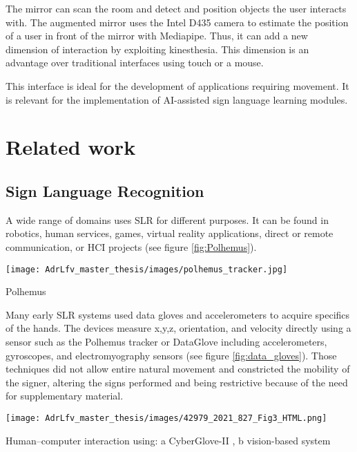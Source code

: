 
The mirror can scan the room and detect and position objects the user interacts with. The augmented mirror uses the Intel D435 camera to estimate the position of a user in front of the mirror with Mediapipe. Thus, it can add a new dimension of interaction by exploiting kinesthesia. This dimension is an advantage over traditional interfaces using touch or a mouse. 

This interface is ideal for the development of applications requiring movement. It is relevant for the implementation of AI-assisted sign language learning modules.

\section{Related work}

\subsection{Sign Language Recognition}

A wide range of domains uses SLR for different purposes. It can be found in robotics, human services, games, virtual reality applications, direct or remote communication, or HCI projects \cite{adeyanju2021machine} (see figure \ref{fig:Polhemus}).

\begin{marginfigure}
    \centering
    \texttt{[image: AdrLfv\_master\_thesis/images/polhemus\_tracker.jpg]}
    \caption{Polhemus}
    \label{fig:Polhemus}
\end{marginfigure}

Many early SLR systems used data gloves and accelerometers to acquire specifics of the hands. The devices measure x,y,z, orientation, and velocity directly using a sensor such as the Polhemus tracker \cite{413199} \cite{5738842} or DataGlove \cite{Kadous1970} \cite{Metaxas1970} including accelerometers, gyroscopes, and electromyography sensors  (see figure \ref{fig:data_gloves}). Those techniques did not allow entire natural movement and constricted the mobility of the signer, altering the signs performed and being restrictive because of the need for supplementary material.

\begin{marginfigure}
    \centering
    \texttt{[image: AdrLfv\_master\_thesis/images/42979\_2021\_827\_Fig3\_HTML.png]}
    \caption{Human–computer interaction using: a CyberGlove-II \cite{cyberglovesystems}, b vision-based system}
    \label{fig:data_gloves}
\end{marginfigure}

